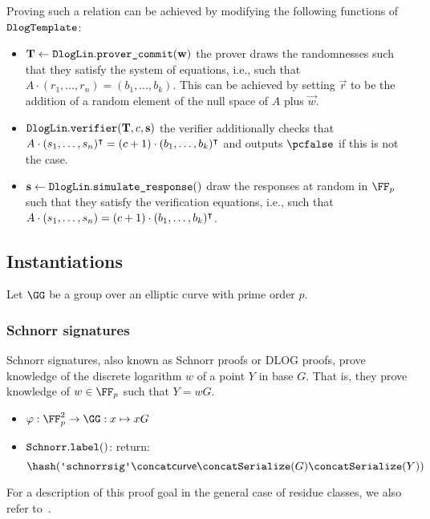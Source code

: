 \documentclass[11pt]{article}
\begin{document}
Proving such a relation can be achieved by modifying the following functions of $\texttt{DlogTemplate}$:
\begin{itemize}
  \item $\mathbf {T} \gets \texttt{DlogLin}.\texttt{prover\_commit}(\mathbf {w})$
    the prover draws the randomnesses such that they satisfy the system of equations, i.e., such that $A\cdot(r_1,\dots,r_n)=(b_1,\dots,b_k)$.
    This can be achieved by setting $\vec r$ to be the addition of a random element of the null space of $A$ plus $\vec w$.
  \item $\texttt{DlogLin}.\texttt{verifier}(\mathbf {T}, c, \mathbf {s})$
   the verifier additionally checks that $A\cdot(s_1,\dots,s_n)^\intercal=(c+1)\cdot(b_1,\dots,b_k)^\intercal$ and outputs $\reject$ if this is not the case.
  \item
    $\mathbf s \gets \texttt{DlogLin}.\texttt{simulate\_response}()$ draw the responses at random in $\FF_p$ such that they satisfy the verification equations, i.e., such that $A\cdot(s_1,\dots,s_n)=(c+1)\cdot(b_1,\dots,b_k)^\intercal$.
\end{itemize}

\subsection{Instantiations}
Let $\GG$ be a group over an elliptic curve with prime order $p$.

\subsubsection{Schnorr signatures}
Schnorr signatures, also known as Schnorr proofs or DLOG proofs, prove knowledge of the discrete logarithm $w$ of a point $Y$ in base $G$.
That is, they prove knowledge of $w\in\FF_p$ such that $Y=wG$.

\begin{itemize}
  \item $\varphi:\FF_p^2\to\GG:x\mapsto xG$
  \item $\texttt{Schnorr}.\texttt{label}()$: return:
  \[
    \hash(\schnorrlabel \concat \curvectx \concat \serialize(G) \concat \serialize(Y))
  \]
\end{itemize}

For a description of this proof goal in the general case of residue classes, we also refer to~\cite[1.4.1]{zkproof-reference}.
\end{document}
